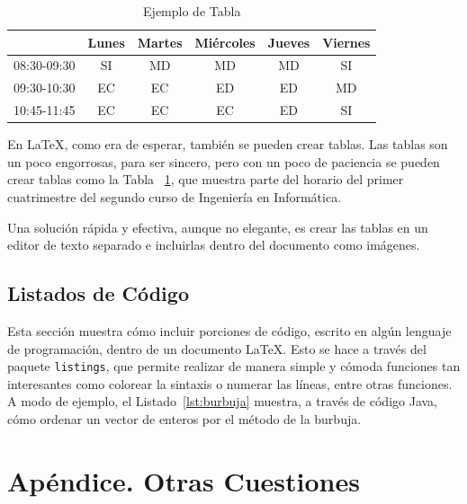 \documentclass{article}
\begin{document}
\begin{table}[!b]
	\begin{center}
		\begin{tabular}{|l|c|c|c|c|c|}
		\hline
		             & Lunes & Martes & Miércoles & Jueves & Viernes \\ \hline
		 08:30-09:30 & SI    & MD     & MD        & MD     & SI \\ \hline
		 09:30-10:30 & EC    & EC     & ED        & ED     & MD \\ \hline
		 10:45-11:45 & EC    & EC     & EC        & ED     & SI \\ \hline	 	          
		\end{tabular}
		\caption{Ejemplo de Tabla}
		\label{tabla:ejemplo}
	\end{center}
\end{table}

En \LaTeX, como era de esperar, también se pueden crear tablas. Las tablas son un poco engorrosas, para ser sincero, pero con un poco de paciencia se pueden crear tablas como la Tabla ~\ref{tabla:ejemplo}, que muestra parte del horario del primer cuatrimestre del segundo curso de Ingeniería en Informática.

Una solución rápida y efectiva, aunque no elegante, es crear las tablas en un editor de texto separado e incluirlas dentro del documento como imágenes.

\subsection{Listados de Código}

Esta sección muestra cómo incluir porciones de código, escrito en algún lenguaje de programación, dentro de un documento \LaTeX. Esto se hace a través del paquete \texttt{listings}, que permite realizar de manera simple y cómoda funciones tan interesantes como colorear la sintaxis o numerar las líneas, entre otras funciones. A modo de ejemplo, el Listado~\ref{lst:burbuja} muestra, a través de código Java, cómo ordenar un vector de enteros por el método de la burbuja. 



\section*{Apéndice. Otras Cuestiones}
\end{document}
